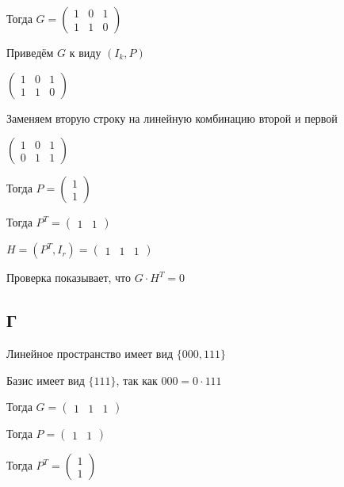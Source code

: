 \documentclass{article}
\begin{document}
	Тогда $
	G = \left(
	\begin{array}{cccccccccc}
	1 & 0 & 1\\
	1 & 1 & 0
	\end{array}
	\right)
	$
	
	Приведём $G$ к виду $(I_k, P)$
	
	$
	\left(
	\begin{array}{cccccccccc}
	1 & 0 & 1\\
	1 & 1 & 0
	\end{array}
	\right)
	$
	
	Заменяем вторую строку на линейную комбинацию второй и первой
	
	$
	\left(
	\begin{array}{cccccccccc}
	1 & 0 & 1\\
	0 & 1 & 1
	\end{array}
	\right)
	$
	
	Тогда $
	P = \left(
	\begin{array}{cccccccccc}
	1\\
	1
	\end{array}
	\right)
	$
	
	Тогда $
	P^T = \left(
	\begin{array}{cccccccccc}
	1 & 1
	\end{array}
	\right)
	$
	
	$H = (P^T, I_r) =  \left(
	\begin{array}{cccccccccc}
	1 & 1 & 1
	\end{array}
	\right)$
	
	Проверка показывает, что $G \cdot H^T = 0$
	
	\subsection{Г}
	Линейное пространство имеет вид $\{000,111\}$
	
	Базис имеет вид $\{111\}$, так как $000 = 0 \cdot 111$
	
	Тогда $
	G = \left(
	\begin{array}{cccccccccc}
	1 & 1 & 1
	\end{array}
	\right)
	$
	
	Тогда $P = \left(
	\begin{array}{cccccccccc}
	1 & 1
	\end{array}
	\right)$
	
	Тогда $P^T = \left(
	\begin{array}{cccccccccc}
	1\\
	1
	\end{array}
	\right)$
	
\end{document}
